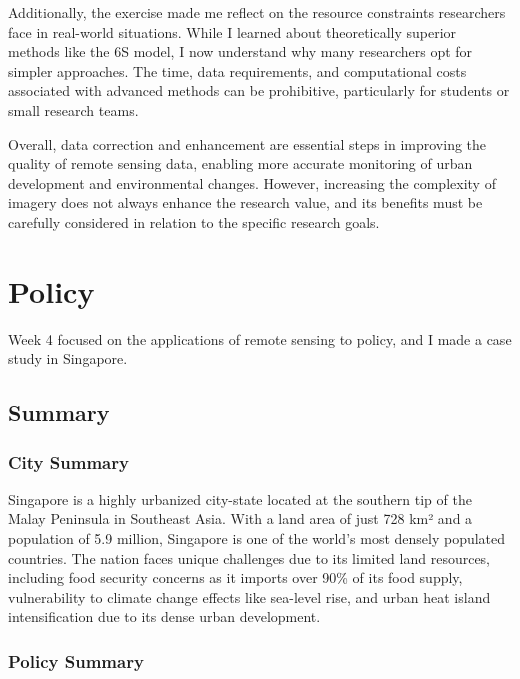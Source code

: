 \documentclass[
  letterpaper,
  DIV=11,
  numbers=noendperiod]{scrreprt}
\begin{document}
Additionally, the exercise made me reflect on the resource constraints
researchers face in real-world situations. While I learned about
theoretically superior methods like the 6S model, I now understand why
many researchers opt for simpler approaches. The time, data
requirements, and computational costs associated with advanced methods
can be prohibitive, particularly for students or small research teams.

Overall, data correction and enhancement are essential steps in
improving the quality of remote sensing data, enabling more accurate
monitoring of urban development and environmental changes. However,
increasing the complexity of imagery does not always enhance the
research value, and its benefits must be carefully considered in
relation to the specific research goals.


\chapter{Policy}\label{policy}

Week 4 focused on the applications of remote sensing to policy, and I
made a case study in Singapore.

\section{Summary}\label{summary-2}

\subsection{City Summary}\label{city-summary}

Singapore is a highly urbanized city-state located at the southern tip
of the Malay Peninsula in Southeast Asia. With a land area of just 728
km² and a population of 5.9 million, Singapore is one of the world's
most densely populated countries. The nation faces unique challenges due
to its limited land resources, including food security concerns as it
imports over 90\% of its food supply, vulnerability to climate change
effects like sea-level rise, and urban heat island intensification due
to its dense urban development.

\subsection{Policy Summary}\label{policy-summary}
\end{document}
